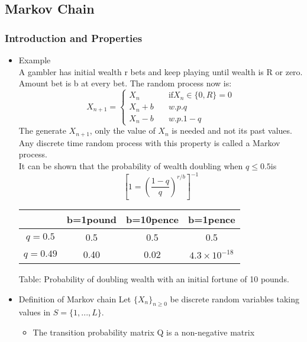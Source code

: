 \documentclass[12pt]{article}
\begin{document}
\subsection{Markov Chain}
\subsubsection{Introduction and Properties}
\begin{itemize}
\item Example \\
A gambler has initial wealth r bets and keep playing until wealth is R or zero. Amount bet is b at every bet. The random process now is:
\[
X_{n+1} = \left\{ \begin{array}{ll}
					X_n \quad & \textrm{if} X_n \in \{0,R \}=0 \\
					X_n + b \quad & w.p. q \\
					X_n - b \quad & w.p. 1-q
\end{array} \right.
\] 
The generate $X_{n+1}$, only the value of $X_n$ is needed and not its past values. Any discrete time random process with this property is called a Markov process. \\
It can be shown that the probability of wealth doubling when $q \le 0.5$is 
\[
\left[ 1 = \left(\frac{1-q}{q}\right)^{r/b}\right]^{-1}
\]

\begin{tabular}{ |c|c|c|c|} 
\hline
 & b=1pound & b=10pence  & b=1pence\\
\hline
\hline
$q=0.5$ & 0.5 & 0.5 & 0.5 \\ 
$q=0.49$ & 0.40 & 0.02 & $4.3 \times 10^{-18}$\\ 
\hline
\end{tabular}
Table: Probability of doubling wealth with an initial fortune of 10 pounds.

\item Definition of Markov chain Let $\{ X_n\}_{n \ge 0}$ be discrete random variables taking values in $S = \{1,...,L \}.$
\begin{itemize}
\item The transition probability matrix Q is a non-negative matrix 
\end{itemize}


\end{itemize}
\end{document}
